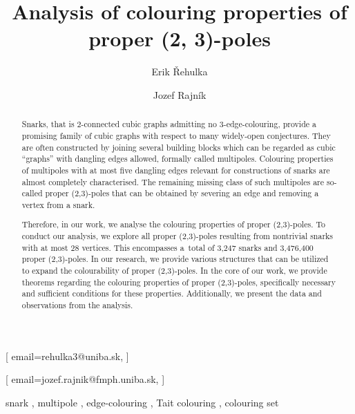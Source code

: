 \documentclass[
twocolumn,
]{ceurart}
\begin{document}


\title{Analysis of colouring properties of proper (2, 3)-poles}


\author[1]{Erik Řehulka}[%
email=rehulka3@uniba.sk,
]
\address[1]{Comenius University, Mlynská dolina, 842 48 Bratislava, Slovakia}

\author[1]{Jozef Rajník}[%
email=jozef.rajnik@fmph.uniba.sk,
]

\begin{abstract}
  Snarks, that is $2$-connected cubic graphs admitting no $3$-edge-colouring, provide a promising family of cubic graphs with respect to many widely-open conjectures. They are often constructed by joining several building blocks which can be regarded as cubic ``graphs'' with dangling edges allowed, formally called multipoles. Colouring properties of multipoles with at most five dangling edges relevant for constructions of snarks are almost completely characterised. The remaining missing class of such multipoles are so-called proper (2,3)-poles that can be obtained by severing an edge and removing a vertex from a snark.
    
    Therefore, in our work, we analyse the colouring properties of proper (2,3)-poles. To conduct our analysis, we explore all proper (2,3)-poles resulting from nontrivial snarks with at most 28 vertices. This encompasses a~total of 3,247 snarks and 3,476,400 proper (2,3)-poles. In our research, we provide various structures that can be utilized to expand the colourability of proper (2,3)-poles. In the core of our work, we provide theorems regarding the colouring properties of proper (2,3)-poles, specifically necessary and sufficient conditions for these properties. Additionally, we present the data and observations from the analysis.
\end{abstract}

\begin{keywords}
	snark \sep 
	multipole \sep 
	edge-colouring \sep 
	Tait colouring \sep 
	colouring set
\end{keywords}
\end{document}
